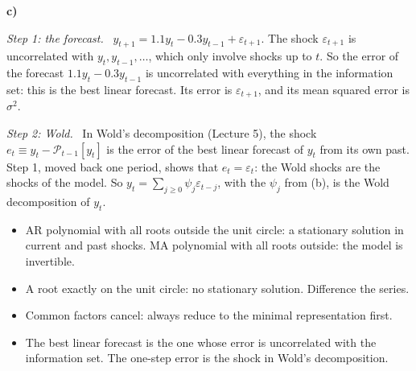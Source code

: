 \documentclass[11pt]{article}
\newcommand{\itm}[1]{\par\needspace{4\baselineskip}\textbf{#1)}\ }
\newcommand{\step}[1]{\par\emph{Step #1.}\ }
\begin{document}
\itm{c}
\step{1: the forecast} $y_{t+1}=1.1y_t-0.3y_{t-1}+\varepsilon_{t+1}$. The shock $\varepsilon_{t+1}$ is uncorrelated with $y_t,y_{t-1},\dots$, which only involve shocks up to $t$. So the error of the forecast $1.1y_t-0.3y_{t-1}$ is uncorrelated with everything in the information set: this is the best linear forecast. Its error is $\varepsilon_{t+1}$, and its mean squared error is $\sigma^2$.

\step{2: Wold} In Wold's decomposition (Lecture 5), the shock $e_t\equiv y_t-\mathcal P_{t-1}[y_t]$ is the error of the best linear forecast of $y_t$ from its own past. Step 1, moved back one period, shows that $e_t=\varepsilon_t$: the Wold shocks are the shocks of the model. So $y_t=\sum_{j\ge0}\psi_j\varepsilon_{t-j}$, with the $\psi_j$ from (b), is the Wold decomposition of $y_t$.

\begin{takeaway}
\begin{itemize}
	\item AR polynomial with all roots outside the unit circle: a stationary solution in current and past shocks. MA polynomial with all roots outside: the model is invertible.
	\item A root exactly on the unit circle: no stationary solution. Difference the series.
	\item Common factors cancel: always reduce to the minimal representation first.
	\item The best linear forecast is the one whose error is uncorrelated with the information set. The one-step error is the shock in Wold's decomposition.
\end{itemize}
\end{takeaway}
\end{document}
